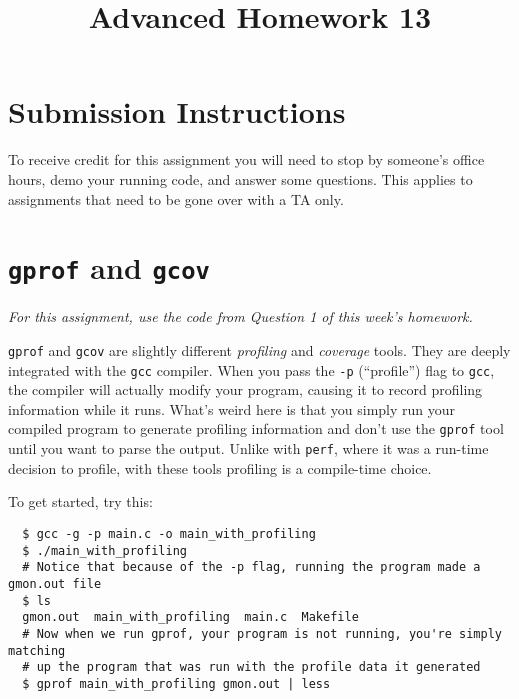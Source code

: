 \documentclass{article}
\begin{document}
\fancyfoot[C]{\color{gray} \thepage~/~\pageref*{LastPage}}
\pagestyle{fancyplain}

\title{\textbf{Advanced Homework 13\\}}
\author{\textbf{\color{red}{Due: Wednesday, December 13th, 11:59PM (Hard Deadline)}}}
\date{}
\maketitle


\section*{Submission Instructions}
To receive credit for this assignment you will need to stop by someone's
office hours, demo your running code, and answer some questions. \textbf{\color{red}{Make sure
to check the office hour schedule as the real due date is at the last office
hours before the date listed above.}} This applies to assignments that need to be gone over with a TA only.


\section*{\texttt{gprof} and \texttt{gcov}}

\emph{For this assignment, use the code from Question 1 of this week's
  homework.}

\texttt{gprof} and \texttt{gcov} are slightly different \emph{profiling} and
\emph{coverage} tools. They are deeply integrated with the \texttt{gcc}
compiler. When you pass the \texttt{-p} (``profile'') flag to \texttt{gcc},
the compiler will actually modify your program, causing it to record profiling
information while it runs. What's weird here is that you simply run your
compiled program to generate profiling information and don't use the
\texttt{gprof} tool until you want to parse the output. Unlike with
\texttt{perf}, where it was a run-time decision to profile, with these tools
profiling is a compile-time choice.

To get started, try this:
\begin{verbatim}
  $ gcc -g -p main.c -o main_with_profiling
  $ ./main_with_profiling
  # Notice that because of the -p flag, running the program made a gmon.out file
  $ ls
  gmon.out  main_with_profiling  main.c  Makefile
  # Now when we run gprof, your program is not running, you're simply matching
  # up the program that was run with the profile data it generated
  $ gprof main_with_profiling gmon.out | less
\end{verbatim}
\end{document}
